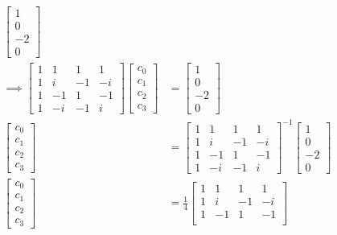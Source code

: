 \documentclass[11pt]{article}       %
\theoremstyle{definition}
\begin{document}
\begin{align*}
\begin{bmatrix}
        1 \\ 0 \\ -2 \\ 0
    \end{bmatrix} \\
    \implies \begin{bmatrix}
        1 & 1 & 1 & 1 \\
        1 & i & -1 & -i \\
        1 & -1 & 1 & -1 \\
        1 & -i & -1 & i
    \end{bmatrix}
    \begin{bmatrix}
        c_0 \\ c_1 \\ c_2 \\ c_3
    \end{bmatrix}
    &=
    \begin{bmatrix}
        1 \\ 0 \\ -2 \\ 0
    \end{bmatrix} \\
    \begin{bmatrix}
        c_0 \\ c_1 \\ c_2 \\ c_3
    \end{bmatrix}
    &= \begin{bmatrix}
        1 & 1 & 1 & 1 \\
        1 & i & -1 & -i \\
        1 & -1 & 1 & -1 \\
        1 & -i & -1 & i
    \end{bmatrix}^{-1}
    \begin{bmatrix}
        1 \\ 0 \\ -2 \\ 0
    \end{bmatrix} \\
    \begin{bmatrix}
        c_0 \\ c_1 \\ c_2 \\ c_3
    \end{bmatrix}
    &= \frac14\begin{bmatrix}
        1 & 1 & 1 & 1 \\
        1 & i & -1 & -i \\
        1 & -1 & 1 & -1 \\

\end{bmatrix}
\end{align*}
\end{document}
